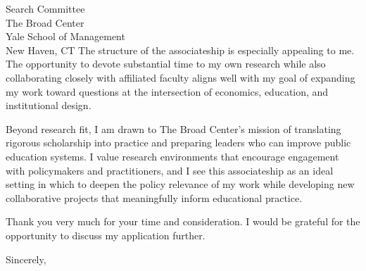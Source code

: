 \documentclass[11pt,letterpaper]{letter}
\begin{document}
\begin{letter}{
Search Committee \\
The Broad Center \\
Yale School of Management \\
New Haven, CT
}
The structure of the associateship is especially appealing to me. The opportunity to devote substantial time to my own research while also collaborating closely with affiliated faculty aligns well with my goal of expanding my work toward questions at the intersection of economics, education, and institutional design. 

Beyond research fit, I am drawn to The Broad Center’s mission of translating rigorous scholarship into practice and preparing leaders who can improve public education systems. I value research environments that encourage engagement with policymakers and practitioners, and I see this associateship as an ideal setting in which to deepen the policy relevance of my work while developing new collaborative projects that meaningfully inform educational practice.

Thank you very much for your time and consideration. I would be grateful for the opportunity to discuss my application further.

\closing{Sincerely,}

\end{letter}
\end{document}
